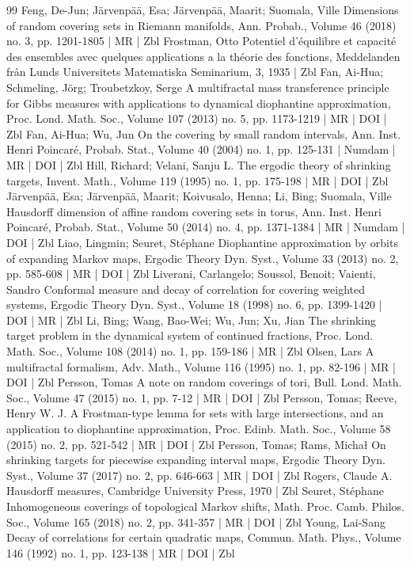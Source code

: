 \documentclass[10pt]{amsart}
\theoremstyle{definition}\newtheorem{defi}[theo]{Definition}\newtheorem{rema}[theo]{Remark}\newtheorem{exam}[theo]{Example}\newtheorem{exem}[theo]{Example}\newtheorem{nota}[theo]{Notation}
\begin{document}
\begin{thebibliography}{99}
Feng, De-Jun; Järvenpää, Esa; Järvenpää, Maarit; Suomala, Ville Dimensions of random covering sets in Riemann manifolds, Ann. Probab., Volume 46 (2018) no. 3, pp. 1201-1805 | MR | Zbl
Frostman, Otto Potentiel d’équilibre et capacité des ensembles avec quelques applications a la théorie des fonctions, Meddelanden från Lunds Universitets Matematiska Seminarium, 3, 1935 | Zbl
Fan, Ai-Hua; Schmeling, Jörg; Troubetzkoy, Serge A multifractal mass transference principle for Gibbs measures with applications to dynamical diophantine approximation, Proc. Lond. Math. Soc., Volume 107 (2013) no. 5, pp. 1173-1219 | MR | DOI | Zbl
Fan, Ai-Hua; Wu, Jun On the covering by small random intervals, Ann. Inst. Henri Poincaré, Probab. Stat., Volume 40 (2004) no. 1, pp. 125-131 | Numdam | MR | DOI | Zbl
Hill, Richard; Velani, Sanju L. The ergodic theory of shrinking targets, Invent. Math., Volume 119 (1995) no. 1, pp. 175-198 | MR | DOI | Zbl
Järvenpää, Esa; Järvenpää, Maarit; Koivusalo, Henna; Li, Bing; Suomala, Ville Hausdorff dimension of affine random covering sets in torus, Ann. Inst. Henri Poincaré, Probab. Stat., Volume 50 (2014) no. 4, pp. 1371-1384 | MR | Numdam | DOI | Zbl
Liao, Lingmin; Seuret, Stéphane Diophantine approximation by orbits of expanding Markov maps, Ergodic Theory Dyn. Syst., Volume 33 (2013) no. 2, pp. 585-608 | MR | DOI | Zbl
Liverani, Carlangelo; Soussol, Benoit; Vaienti, Sandro Conformal measure and decay of correlation for covering weighted systems, Ergodic Theory Dyn. Syst., Volume 18 (1998) no. 6, pp. 1399-1420 | DOI | MR | Zbl
Li, Bing; Wang, Bao-Wei; Wu, Jun; Xu, Jian The shrinking target problem in the dynamical system of continued fractions, Proc. Lond. Math. Soc., Volume 108 (2014) no. 1, pp. 159-186 | MR | Zbl
Olsen, Lars A multifractal formalism, Adv. Math., Volume 116 (1995) no. 1, pp. 82-196 | MR | DOI | Zbl
Persson, Tomas A note on random coverings of tori, Bull. Lond. Math. Soc., Volume 47 (2015) no. 1, pp. 7-12 | MR | DOI | Zbl
Persson, Tomas; Reeve, Henry W. J. A Frostman-type lemma for sets with large intersections, and an application to diophantine approximation, Proc. Edinb. Math. Soc., Volume 58 (2015) no. 2, pp. 521-542 | MR | DOI | Zbl
Persson, Tomas; Rams, Michał On shrinking targets for piecewise expanding interval maps, Ergodic Theory Dyn. Syst., Volume 37 (2017) no. 2, pp. 646-663 | MR | DOI | Zbl
Rogers, Claude A. Hausdorff measures, Cambridge University Press, 1970 | Zbl
Seuret, Stéphane Inhomogeneous coverings of topological Markov shifts, Math. Proc. Camb. Philos. Soc., Volume 165 (2018) no. 2, pp. 341-357 | MR | DOI | Zbl
Young, Lai-Sang Decay of correlations for certain quadratic maps, Commun. Math. Phys., Volume 146 (1992) no. 1, pp. 123-138 | MR | DOI | Zbl
\end{thebibliography}
\end{document}
